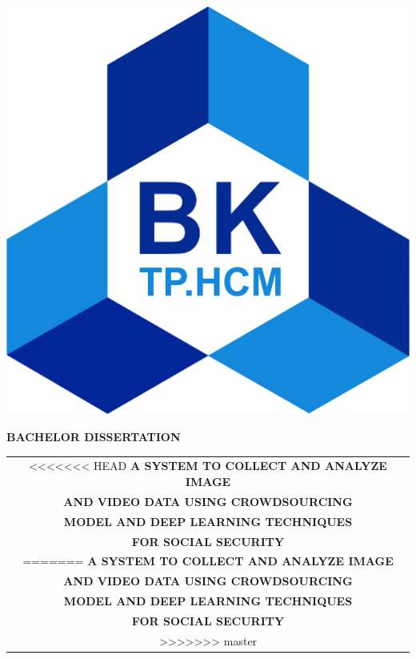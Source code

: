 \begin{titlepage}
\vspace{0.4cm}
\begin{center}
\includegraphics[scale=0.35]{hcmut.png}\\[1cm]
\end{center}
\vspace{-0.75cm}
\begin{center}
\large 
	\bfseries BACHELOR DISSERTATION \\
\end{center}
\vspace{-1.25cm}
\begin{center}
\Large
	\begin{tabular}{@{}c}
<<<<<<< HEAD
	 	\bfseries{A SYSTEM TO COLLECT AND ANALYZE IMAGE}\\  
		\bfseries{AND VIDEO DATA USING CROWDSOURCING} \\     
		\bfseries{MODEL AND DEEP LEARNING TECHNIQUES} \\ 
		\bfseries{ FOR SOCIAL SECURITY} \\[0.5cm] 
=======
	\bfseries{A SYSTEM TO COLLECT AND ANALYZE IMAGE}\\ 
		\bfseries{AND VIDEO DATA USING CROWDSOURCING} \\		
		\bfseries{MODEL AND DEEP LEARNING TECHNIQUES} \\
		\bfseries{ FOR SOCIAL SECURITY} \\[0.5cm]
>>>>>>> master


\end{tabular}
\end{center}
\end{titlepage}
